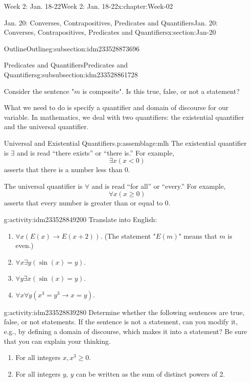 \documentclass[oneside,10pt,]{book}
\numberwithin{equation}{section}
\renewcommand{\ge}{\geqslant}
\def\imp{\to}
\newcommand{\imp}{\rightarrow}
\newcommand{\lt}{<}
\begin{document}
\begin{chapterptx}{Week 2: Jan. 18-22}{}{Week 2: Jan. 18-22}{}{}{x:chapter:Week-02}
\begin{sectionptx}{Jan. 20: Converses, Contrapositives, Predicates and Quantifiers}{}{Jan. 20: Converses, Contrapositives, Predicates and Quantifiers}{}{}{x:section:Jan-20}
\begin{subsectionptx}{Outline}{}{Outline}{}{}{g:subsection:idm233528873696}
\begin{subsubsectionptx}{Predicates and Quantifiers}{}{Predicates and Quantifiers}{}{}{g:subsubsection:idm233528861728}
\par
Consider the sentence "\(m\) is composite". Is this true, false, or not a statement?%
\par
What we need to do is specify a quantifier and domain of discourse for our variable. In mathematics, we deal with two quantifiers: the existential quantifier and the universal quantifier.%
\begin{assemblage}{Universal and Existential Quantifiers.}{p:assemblage:mlh}%
The existential quantifier is \(\exists\) and is read ``there exists'' or ``there is.'' For example, \label{g:notation:idm233528850736}%
\begin{equation*}
\exists x (x \lt 0)
\end{equation*}
asserts that there is a number less than 0.%
\par
The universal quantifier is \(\forall\) and is read ``for all'' or ``every.'' For example, \label{g:notation:idm233528845248}%
\begin{equation*}
\forall x (x \ge 0)
\end{equation*}
asserts that every number is greater than or equal to 0.%
\end{assemblage}
\begin{activity}{}{g:activity:idm233528849200}%
Translate into English:%
\begin{enumerate}
\item{}\(\forall x (E(x) \imp E(x +2))\). (The statement "\(E(m)\)" means that \(m\) is even.)%
\item{}\(\forall x \exists y (\sin(x) = y)\).%
\item{}\(\forall y \exists x (\sin(x) = y)\).%
\item{}\(\forall x \forall y (x^3 = y^3 \imp x = y)\).%
\end{enumerate}
%
\end{activity}%
\begin{activity}{}{g:activity:idm233528839280}%
Determine whether the following sentences are true, false, or not statements. If the sentence is not a statement, can you modify it, e.g., by defining a domain of discourse, which makes it into a statement? Be sure that you can explain your thinking.%
%
\begin{enumerate}
\item{}For all integers \(x, x^3 \ge 0\).%
\item{}For all integers \(y\), \(y\) can be written as the sum of distinct powers of 2.%

\end{enumerate}
\end{activity}
\end{subsubsectionptx}
\end{subsectionptx}
\end{sectionptx}
\end{chapterptx}
\end{document}
